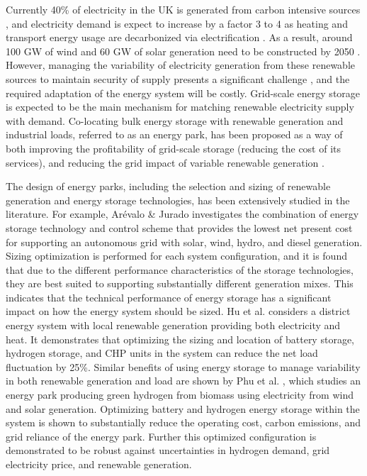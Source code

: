 Currently 40\% of electricity in the UK is generated from carbon intensive sources \citep{desnz2024DigestUKEnergy}, and electricity demand is expect to increase by a factor 3 to 4 as heating and transport energy usage are decarbonized via electrification \citep{nationalgrideso2023FutureEnergyScenarios}. As a result, around 100 GW of wind and 60 GW of solar generation need to be constructed by 2050 \citep{nationalgrideso2023FutureEnergyScenarios}.
However, managing the variability of electricity generation from these renewable sources to maintain security of supply presents a significant challenge \citep{papadis2020ChallengesDecarbonizationEnergy}, and the required adaptation of the energy system will be costly.
Grid-scale energy storage is expected to be the main mechanism for matching renewable electricity supply with demand.
Co-locating bulk energy storage with renewable generation and industrial loads, referred to as an energy park, has been proposed as a way of both improving the profitability of grid-scale storage (reducing the cost of its services), and reducing the grid impact of variable renewable generation \citep{chinaris2025HybridizationWindFarms,fan2021SizingCoordinationStrategies}.

The design of energy parks, including the selection and sizing of renewable generation and energy storage technologies, has been extensively studied in the literature.
For example, Arévalo \& Jurado \citep{arevalo2021PerformanceAnalysisPV} investigates the combination of energy storage technology and control scheme that provides the lowest net present cost for supporting an autonomous grid with solar, wind, hydro, and diesel generation. Sizing optimization is performed for each system configuration, and it is found that due to the different performance characteristics of the storage technologies, they are best suited to supporting substantially different generation mixes. This indicates that the technical performance of energy storage has a significant impact on how the energy system should be sized.
Hu et al. \citep{hu2024OptimalPlanningElectricheating} considers a district energy system with local renewable generation providing both electricity and heat. It demonstrates that optimizing the sizing and location of battery storage, hydrogen storage, and CHP units in the system can reduce the net load fluctuation by 25\%. Similar benefits of using energy storage to manage variability in both renewable generation and load are shown by Phu et al. \citep{phu2024IGDTApproachMultiobjective}, which studies an energy park producing green hydrogen from biomass using electricity from wind and solar generation. Optimizing battery and hydrogen energy storage within the system is shown to substantially reduce the operating cost, carbon emissions, and grid reliance of the energy park. Further this optimized configuration is demonstrated to be robust against uncertainties in hydrogen demand, grid electricity price, and renewable generation.

